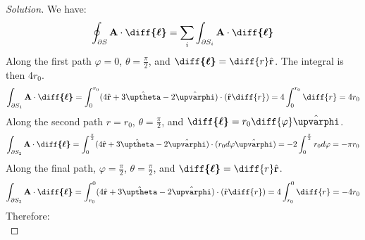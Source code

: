 \documentclass[crop=false,class=article,oneside]{standalone}
\begin{document}
        \begin{proof}[Solution]
            We have:
            \begin{equation*}
                \oint_{\partial S}
                \mathbf{A}\cdot\boldsymbol{\diff{\ell}}
                =\sum_{i}\int_{\partial{S_{i}}}
                \mathbf{A}\cdot\boldsymbol{\diff{\ell}}
            \end{equation*}
            Along the first path $\varphi=0$,
            $\theta=\frac{\pi}{2}$, and
            $\boldsymbol{\diff{\ell}}%
             =\diff{r}\hat{\mathbf{r}}$.
            The integral is then $4r_{0}$.
            \begin{equation*}
                \int_{\partial S_{1}}
                \mathbf{A}\cdot\boldsymbol{\diff{\ell}}
                =\int_{0}^{r_{0}}
                (4\hat{\mathbf{r}}
                +3\hat{\boldsymbol{\uptheta}}
                -2\hat{\boldsymbol{\upvarphi}})
                \cdot(\hat{\mathbf{r}}\diff{r})
                =4\int_{0}^{r_{0}}\diff{r}
                =4r_{0}
            \end{equation*}
            Along the second path $r=r_{0}$,
            $\theta=\frac{\pi}{2}$, and 
            $\boldsymbol{\diff{\ell}}%
             =r_{0}\diff{\varphi}\hat{\boldsymbol{\upvarphi}}$.
            \begin{equation*}
                \int_{\partial S_{2}}
                \mathbf{A}\cdot\boldsymbol{\diff{\ell}}
                =\int_{0}^{\frac{\pi}{2}}(4\hat{\mathbf{r}}
                +3\hat{\boldsymbol{\uptheta}}
                -2\hat{\boldsymbol{\upvarphi}})
                \cdot(r_{0}d\varphi\hat{\boldsymbol{\upvarphi}})
                =-2\int_{0}^{\frac{\pi}{2}}r_{0}d\varphi
                =-\pi r_{0}
            \end{equation*}
            Along the final path, $\varphi=\frac{\pi}{2}$,
            $\theta=\frac{\pi}{2}$, and
            $\boldsymbol{\diff{\ell}}%
             =\diff{r}\hat{\mathbf{r}}$.
            \begin{equation*}
                \int_{\partial S_{3}}
                \mathbf{A}\cdot\boldsymbol{\diff{\ell}}
                =\int_{r_{0}}^{0}
                (4\hat{\mathbf{r}}
                 +3\hat{\boldsymbol{\uptheta}}
                 -2\hat{\boldsymbol{\upvarphi}})
                \cdot(\hat{\mathbf{r}}\diff{r})
                =4\int_{r_{0}}^{0}\diff{r}
                =-4r_{0}
            \end{equation*}
            Therefore:
            \begin{equation*}

\end{equation*}
\end{proof}
\end{document}
